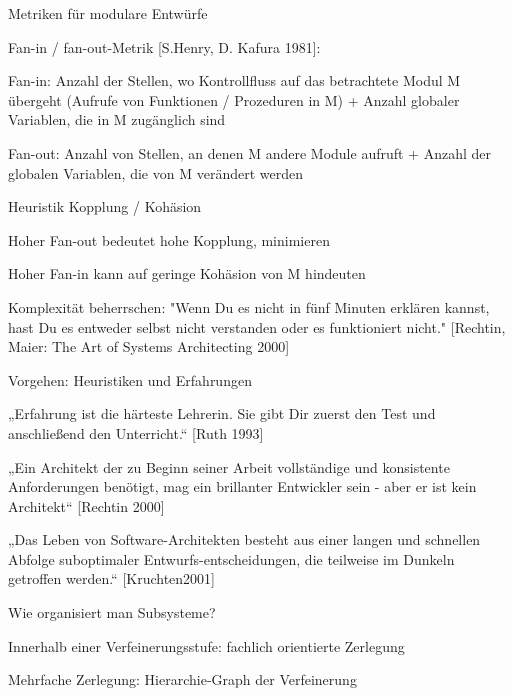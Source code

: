 \documentclass[a4paper]{article}
\begin{document}
\begin{multicols}{3}
  Metriken für modulare Entwürfe
  \begin{itemize*}
    \item Fan-in / fan-out-Metrik [S.Henry, D. Kafura 1981]:
          \begin{itemize*}
            \item Fan-in: Anzahl der Stellen, wo Kontrollfluss auf das betrachtete Modul M übergeht (Aufrufe von Funktionen / Prozeduren in M) + Anzahl globaler Variablen, die in M zugänglich sind
            \item Fan-out: Anzahl von Stellen, an denen M andere Module aufruft + Anzahl der globalen Variablen, die von M verändert werden
          \end{itemize*}
    \item Heuristik Kopplung / Kohäsion
          \begin{itemize*}
            \item Hoher Fan-out bedeutet hohe Kopplung, minimieren
            \item Hoher Fan-in kann auf geringe Kohäsion von M hindeuten
          \end{itemize*}
  \end{itemize*}

  Komplexität beherrschen: "Wenn Du es nicht in fünf Minuten erklären kannst, hast Du es entweder selbst nicht verstanden oder es funktioniert nicht." [Rechtin, Maier: The Art of Systems Architecting 2000]

  Vorgehen: Heuristiken und Erfahrungen
  \begin{itemize*}
    \item „Erfahrung ist die härteste Lehrerin. Sie gibt Dir zuerst den Test und anschließend den Unterricht.“ [Ruth 1993]
    \item „Ein Architekt der zu Beginn seiner Arbeit vollständige und konsistente Anforderungen benötigt, mag ein brillanter Entwickler sein - aber er ist kein Architekt“ [Rechtin 2000]
    \item „Das Leben von Software-Architekten besteht aus einer langen und schnellen Abfolge suboptimaler Entwurfs-entscheidungen, die teilweise im Dunkeln getroffen werden.“ [Kruchten2001]
  \end{itemize*}

  Wie organisiert man Subsysteme?
  \begin{itemize*}
    \item Innerhalb einer Verfeinerungsstufe: fachlich orientierte Zerlegung
    \item Mehrfache Zerlegung: Hierarchie-Graph der Verfeinerung
  \end{itemize*}


\end{multicols}
\end{document}
